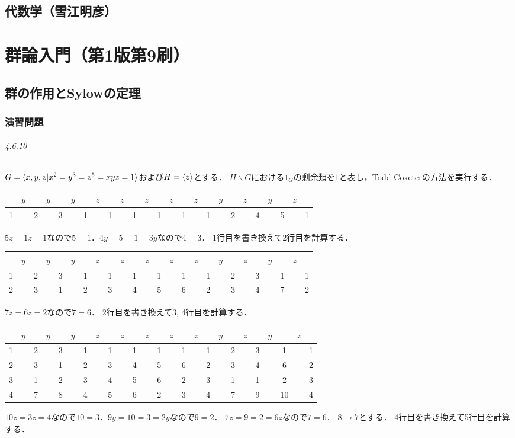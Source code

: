\documentclass[a4paper]{ltjsreport}
\begin{document}
\chapter*{代数学（雪江明彦）}
\part{群論入門（第1版第9刷）}
\setcounter{chapter}{3}
\chapter{群の作用とSylowの定理}
\section*{演習問題}
\paragraph{4.6.10}
$G = \braket{ x,y,z | x^2 = y^3 = z^5 = xyz = 1 }$および$H = \braket{z}$とする．
$H \backslash G$における$1_G$の剰余類を$1$と表し，Todd-Coxeterの方法を実行する．

\begin{center}
  \begin{tabular}{c|cccccc|cccccccccc|cccccccc}
    & $y$ && $y$ && $y$ && $z$ && $z$ && $z$ && $z$ && $z$ && $y$ && $z$ && $y$ && $z$ & \\ \hline
    1 && 2 && 3 && 1 && 1 && 1 && 1 && 1 && 1 && 2 && 4 && 5 && 1
  \end{tabular}
\end{center}
$5z = 1z = 1$なので$5 = 1$．$4y = 5 = 1 = 3y$なので$4=3$．
1行目を書き換えて2行目を計算する．

\begin{center}
  \begin{tabular}{c|cccccc|cccccccccc|cccccccc}
    & $y$ && $y$ && $y$ && $z$ && $z$ && $z$ && $z$ && $z$ && $y$ && $z$ && $y$ && $z$ & \\ \hline
    1 && 2 && 3 && 1 && 1 && 1 && 1 && 1 && 1 && 2 && 3 && 1 && 1 \\
    2 && 3 && 1 && 2 && 3 && 4 && 5 && 6 && 2 && 3 && 4 && 7 && 2
  \end{tabular}
\end{center}
$7z = 6z = 2$なので$7 = 6$．
2行目を書き換えて3, 4行目を計算する．

\begin{center}
  \begin{tabular}{c|cccccc|cccccccccc|cccccccc}
    & $y$ && $y$ && $y$ && $z$ && $z$ && $z$ && $z$ && $z$ && $y$ && $z$ && $y$ && $z$ & \\ \hline
    1 && 2 && 3 && 1 && 1 && 1 && 1 && 1 && 1 && 2 && 3 && 1 && 1 \\
    2 && 3 && 1 && 2 && 3 && 4 && 5 && 6 && 2 && 3 && 4 && 6 && 2 \\
    3 && 1 && 2 && 3 && 4 && 5 && 6 && 2 && 3 && 1 && 1 && 2 && 3 \\
    4 && 7 && 8 && 4 && 5 && 6 && 2 && 3 && 4 && 7 && 9 && 10 && 4
  \end{tabular}
\end{center}
$10z = 3z = 4$なので$10 = 3$．$9y = 10 = 3 = 2y$なので$9 = 2$．
$7z = 9 = 2 = 6z$なので$7 = 6$．
$8 \to 7$とする．
4行目を書き換えて5行目を計算する．
\end{document}
